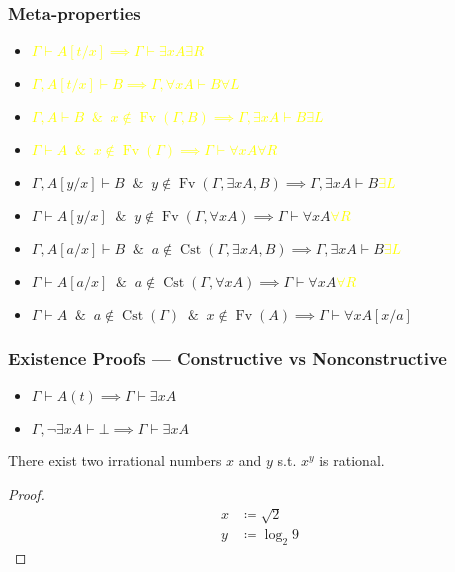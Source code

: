 \documentclass[UTF8,11pt,colorlinks,compress,openany]{beamer}%
\begin{document}
\begin{frame}\frametitle{Meta-properties}
	\begin{itemize}
		\item \textcolor{yellow}{$\Gamma\vdash A[t/x]\implies\Gamma\vdash\exists x A$\hfill $\exists R$}
		\item \textcolor{yellow}{$\Gamma, A[t/x]\vdash B\implies\Gamma,\forall x A\vdash B$\hfill $\forall L$}
		\item \textcolor{yellow}{$\Gamma, A\vdash B\;\;\&\;\;x\notin \operatorname{Fv}(\Gamma,B)\implies\Gamma,\exists x A\vdash B$\hfill $\exists L$}
		\item \textcolor{yellow}{$\Gamma\vdash A\;\;\&\;\;x\notin\operatorname{Fv}(\Gamma)\implies\Gamma\vdash\forall x A$\hfill $\forall R$}
		\item $\Gamma, A[y/x]\vdash B\;\;\&\;\;y\notin \operatorname{Fv}(\Gamma,\exists x A, B)\implies\Gamma,\exists x A\vdash B$\hfill \textcolor{yellow}{$\exists L$}
		\item $\Gamma\vdash A[y/x]\;\;\&\;\;y\notin\operatorname{Fv}(\Gamma,\forall x A)\implies\Gamma\vdash\forall x A$\hfill \textcolor{yellow}{$\forall R$}
		\item $\Gamma, A[a/x]\vdash B\;\;\&\;\;a\notin\operatorname{Cst}(\Gamma,\exists x A, B)\implies\Gamma,\exists x A\vdash B$\hfill \textcolor{yellow}{$\exists L$}
		\item $\Gamma\vdash A[a/x]\;\;\&\;\;a\notin\operatorname{Cst}(\Gamma,\forall x A)\implies\Gamma\vdash\forall x A$\hfill \textcolor{yellow}{$\forall R$}
		\item $\Gamma\vdash A\;\;\&\;\;a\notin\operatorname{Cst}(\Gamma)\;\;\&\;\; x\notin\operatorname{Fv}(A)\implies\Gamma\vdash\forall x A[x/a]$
	\end{itemize}
\end{frame}

\begin{frame}\frametitle{Existence Proofs --- Constructive vs Nonconstructive}
\begin{itemize}
	\item $\Gamma\vdash A(t)\implies \Gamma\vdash\exists xA$
	\item $\Gamma,\neg\exists xA\vdash\bot\implies\Gamma\vdash\exists xA$
\end{itemize}
\begin{theorem}
	There exist two irrational numbers $x$ and $y$ s.t. $x^y$ is rational.
\end{theorem}
\begin{proof}
	\begin{align*}
		x&\coloneqq\sqrt{2}\\
		y&\coloneqq\log_2 9
	\end{align*}
\end{proof}
\end{frame}
\end{document}
